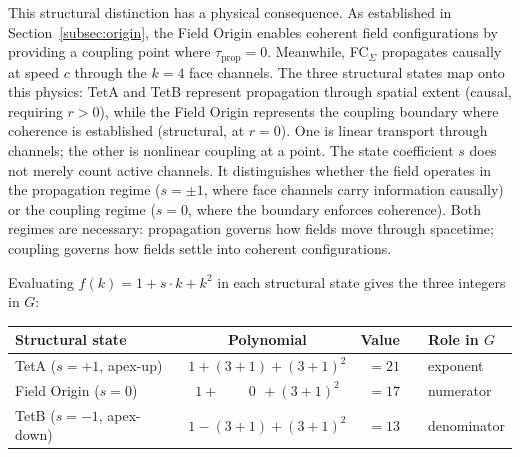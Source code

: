 \documentclass[aps,prd,preprint,superscriptaddress,showpacs,preprintnumbers,amsmath,amssymb,nofootinbib]{revtex4-2}
\begin{document}
This structural distinction has a physical consequence. As established in Section~\ref{subsec:origin}, the Field Origin enables coherent field configurations by providing a coupling point where $\tau_{\text{prop}} = 0$. Meanwhile, FC$_{\Sigma}$ propagates causally at speed $c$ through the $k = 4$ face channels. The three structural states map onto this physics: TetA and TetB represent propagation through spatial extent (causal, requiring $r > 0$), while the Field Origin represents the coupling boundary where coherence is established (structural, at $r = 0$). One is linear transport through channels; the other is nonlinear coupling at a point. The state coefficient $s$ does not merely count active channels. It distinguishes whether the field operates in the propagation regime ($s = \pm 1$, where face channels carry information causally) or the coupling regime ($s = 0$, where the boundary enforces coherence). Both regimes are necessary: propagation governs how fields move through spacetime; coupling governs how fields settle into coherent configurations.

Evaluating $f(k) = 1 + s \cdot k + k^2$ in each structural state gives the three integers in $G$:

\begin{center}
\renewcommand{\arraystretch}{1.4}
\begin{tabular*}{\textwidth}{@{\extracolsep{\fill}} lcrcl}
\hline
\textbf{Structural state} & \textbf{Polynomial} & \textbf{Value} & & \textbf{Role in $G$} \\
\hline
TetA ($s = +1$, apex-up) & $1 + (3{+}1) + (3{+}1)^2$ & $= 21$ & & exponent \\
Field Origin ($s = 0$) & $1 + \phantom{(3{+}}0\phantom{)} + (3{+}1)^2$ & $= 17$ & & numerator \\
TetB ($s = -1$, apex-down) & $1 - (3{+}1) + (3{+}1)^2$ & $= 13$ & & denominator \\
\hline
\end{tabular*}
\end{center}
\end{document}
